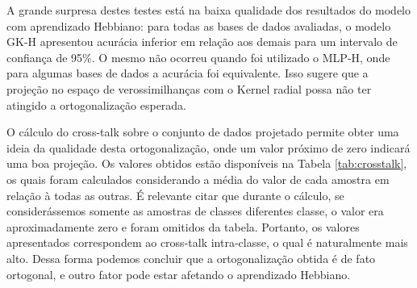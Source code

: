 \documentclass[conference]{IEEEtran}
\begin{document}
	A grande surpresa destes testes está na baixa qualidade dos resultados do modelo com aprendizado Hebbiano: para todas as bases de dados avaliadas, o modelo GK-H apresentou acurácia inferior em relação aos demais para um intervalo de confiança de 95\%. O mesmo não ocorreu quando foi utilizado o MLP-H, onde para algumas bases de dados a acurácia foi equivalente. Isso sugere que a projeção no espaço de verossimilhanças com o Kernel radial possa não ter atingido a ortogonalização esperada. 
	
	O cálculo do cross-talk sobre o conjunto de dados projetado permite obter uma ideia da qualidade desta ortogonalização, onde um valor próximo de zero indicará uma boa projeção. Os valores obtidos estão disponíveis na Tabela \ref{tab:crosstalk}, os quais foram calculados considerando a média do valor de cada amostra em relação à todas as outras. É relevante citar que durante o cálculo, se considerássemos somente as amostras de classes diferentes classe, o valor era aproximadamente zero e foram omitidos da tabela. Portanto, os valores apresentados correspondem ao cross-talk intra-classe, o qual é naturalmente mais alto. Dessa forma podemos concluir que a ortogonalização obtida é de fato ortogonal, e outro fator pode estar afetando o aprendizado Hebbiano.
	
\end{document}
